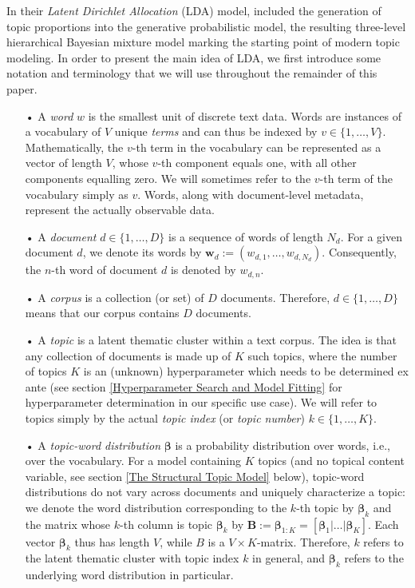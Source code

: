 In their \textit{Latent Dirichlet Allocation} (LDA) model, \cite{blei2003latent} included the generation of topic proportions into the generative probabilistic model, the resulting three-level hierarchical Bayesian mixture model marking the starting point of modern topic modeling. In order to present the main idea of LDA, we first introduce some notation and terminology that we will use throughout the remainder of this paper.

\begin{itemize}
\vspace{-0.25cm}
\item[•] A \textit{word} $w$ is the smallest unit of discrete text data. Words are instances of a vocabulary of $V$ unique \textit{terms} and can thus be indexed by $v \in \{1,\dots,V\}$. Mathematically, the $v$-th term in the vocabulary can be represented as a vector of length $V$, whose $v$-th component equals one, with all other components equalling zero. We will sometimes refer to the $v$-th term of the vocabulary simply as $v$. Words, along with document-level metadata, represent the actually observable data.
\vspace{-0.25cm}
\item[•] A \textit{document} $d \in \{1,\dots,D\}$ is a sequence of words of length $N_{d}$. For a given document $d$, we denote its words by $\boldsymbol{w}_d:=(w_{d,1},\dots,w_{d,N_{d}})$. Consequently, the $n$-th word of document $d$ is denoted by $w_{d,n}$.
\vspace{-0.25cm}
\item[•] A \textit{corpus} is a collection (or set) of $D$ documents. Therefore, $d \in \{1,\dots,D\}$ means that our corpus contains $D$ documents.
\vspace{-0.25cm}
\item[•] A \textit{topic} is a latent thematic cluster within a text corpus. The idea is that any collection of documents is made up of $K$ such topics, where the number of topics $K$ is an (unknown) hyperparameter which needs to be determined ex ante (see section \ref{Hyperparameter Search and Model Fitting} for hyperparameter determination in our specific use case). We will refer to topics simply by the actual \textit{topic index} (or \textit{topic number}) $k \in \{1,\dots,K\}$.
\vspace{-0.25cm}
\item[•] A \textit{topic-word distribution} $\boldsymbol{\beta}$ is a probability distribution over words, i.e., over the vocabulary. For a model containing $K$ topics (and no topical content variable, see section \ref{The Structural Topic Model} below), topic-word distributions do not vary across documents and uniquely characterize a topic: we denote the word distribution corresponding to the $k$-th topic by $\boldsymbol{\beta}_k$ and the matrix whose $k$-th column is topic $\boldsymbol{\beta}_k$ by $\boldsymbol{B}:=\boldsymbol{\beta}_{1:K}=[\boldsymbol{\beta}_1|\dots|\boldsymbol{\beta}_K]$. Each vector $\boldsymbol{\beta}_k$ thus has length $V$, while $B$ is a $V \times K$-matrix. Therefore, $k$ refers to the latent thematic cluster with topic index $k$ in general, and $\boldsymbol{\beta}_k$ refers to the underlying word distribution in particular.

\end{itemize}
